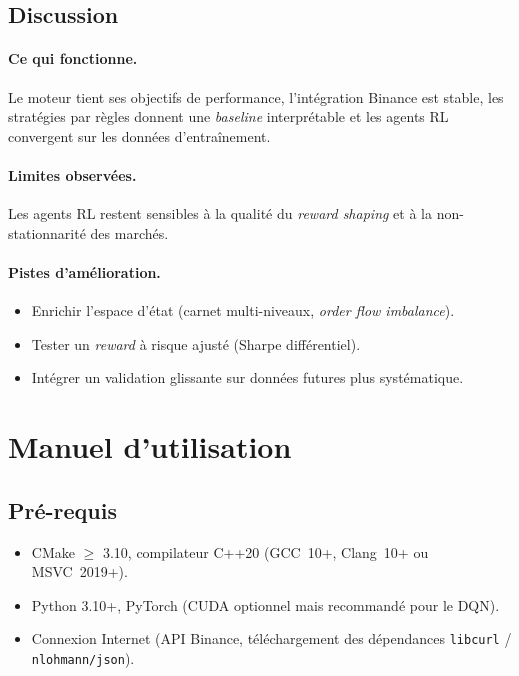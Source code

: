 \documentclass[11pt,a4paper]{article}
\begin{document}
\subsection{Discussion}


\paragraph{Ce qui fonctionne.} Le moteur tient ses
objectifs de performance, l'intégration Binance est
stable, les stratégies par règles donnent une
\textit{baseline} interprétable et les agents RL
convergent sur les données d'entraînement.

\paragraph{Limites observées.} Les agents RL restent
sensibles à la qualité du \textit{reward shaping} et
à la non-stationnarité des marchés.

\paragraph{Pistes d'amélioration.}
\begin{itemize}[leftmargin=1.2cm]
    \item Enrichir l'espace d'état (carnet multi-niveaux,
          \textit{order flow imbalance}).
    \item Tester un \textit{reward} à risque ajusté
          (Sharpe différentiel).
    \item Intégrer un validation glissante sur données futures
          plus systématique.
\end{itemize}

\section{Manuel d'utilisation}
\label{sec:manuel}

\subsection{Pré-requis}

\begin{itemize}[leftmargin=1.2cm]
    \item CMake $\geq$ 3.10, compilateur C++20
          (GCC~10+, Clang~10+ ou MSVC~2019+).
    \item Python 3.10+, PyTorch
          (CUDA optionnel mais recommandé pour le DQN).
    \item Connexion Internet (API Binance, téléchargement
          des dépendances \texttt{libcurl} /
          \texttt{nlohmann/json}).
\end{itemize}
\end{document}
